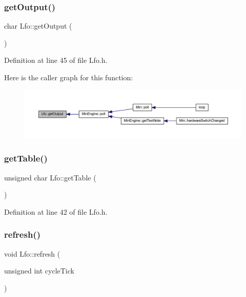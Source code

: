 \mbox{\label{class_lfo_a0363f6a07cb699caf291b4954a40f152}} 
\subsubsection{\texorpdfstring{get\+Output()}{getOutput()}}
{\footnotesize\ttfamily char Lfo\+::get\+Output (\begin{DoxyParamCaption}{ }\end{DoxyParamCaption})\hspace{0.3cm}{\ttfamily [inline]}}



Definition at line 45 of file Lfo.\+h.

Here is the caller graph for this function\+:
\nopagebreak
\begin{figure}[H]
\begin{center}
\leavevmode
\includegraphics[width=350pt]{d6/d5f/class_lfo_a0363f6a07cb699caf291b4954a40f152_icgraph}
\end{center}
\end{figure}
\mbox{\label{class_lfo_a9f017ebd3b628e4afbca7371cdebc61c}} 
\subsubsection{\texorpdfstring{get\+Table()}{getTable()}}
{\footnotesize\ttfamily unsigned char Lfo\+::get\+Table (\begin{DoxyParamCaption}{ }\end{DoxyParamCaption})\hspace{0.3cm}{\ttfamily [inline]}}



Definition at line 42 of file Lfo.\+h.

\mbox{\label{class_lfo_a42c8d118df4ecbf3057319b56203133d}} 
\subsubsection{\texorpdfstring{refresh()}{refresh()}}
{\footnotesize\ttfamily void Lfo\+::refresh (\begin{DoxyParamCaption}\item[{unsigned int}]{cycle\+Tick }\end{DoxyParamCaption})}



